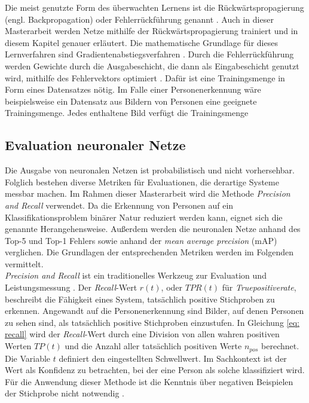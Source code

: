 		Die meist genutzte Form des überwachten Lernens ist die Rückwärtspropagierung (engl. Backpropagation) oder Fehlerrückführung genannt \cite{Ertel}. Auch in dieser Masterarbeit werden Netze mithilfe der Rückwärtspropagierung trainiert und in diesem Kapitel genauer erläutert. Die mathematische Grundlage für dieses Lernverfahren sind Gradientenabstiegsverfahren \cite{Kriesel}. Durch die Fehlerrückführung werden Gewichte durch die Ausgabeschicht, die dann als Eingabeschicht genutzt wird, mithilfe des Fehlervektors optimiert \cite{Kriesel}. Dafür ist eine Trainingsmenge in Form eines Datensatzes nötig. Im Falle einer Personenerkennung wäre beispielsweise ein Datensatz aus Bildern von Personen eine geeignete Trainingsmenge. Jedes enthaltene Bild verfügt die Trainingsmenge\\
		
	
		
		\subsection{Evaluation neuronaler Netze}
		Die Ausgabe von neuronalen Netzen ist probabilistisch und nicht vorhersehbar. Folglich bestehen diverse Metriken für Evaluationen, die derartige Systeme messbar machen. Im Rahmen dieser Masterarbeit wird die Methode \textit{Precision and Recall} verwendet. Da die Erkennung von Personen auf ein Klassifikationsproblem binärer Natur reduziert werden kann, eignet sich die genannte Herangehensweise. Außerdem werden die neuronalen Netze anhand des Top-5 und Top-1 Fehlers sowie anhand der \textit{mean average precision} (mAP) verglichen. Die Grundlagen der entsprechenden Metriken werden im Folgenden vermittelt.\\
		
		\textit{Precision and Recall} ist ein traditionelles Werkzeug zur Evaluation und Leistungsmessung \cite{precisionandrecall}. Der \textit{Recall}-Wert $r(t)$, oder $TPR(t)$ für \textit{Truepositiverate}, beschreibt die Fähigkeit eines System, tatsächlich positive Stichproben zu erkennen. Angewandt auf die Personenerkennung sind Bilder, auf denen Personen zu sehen sind, als tatsächlich positive Stichproben einzustufen. In Gleichung \ref{eq: recall} wird der \textit{Recall}-Wert durch eine Division von allen wahren positiven Werten $TP(t)$ und die Anzahl aller tatsächlich positiven Werte $n_{pos}$ berechnet. Die Variable $t$ definiert den eingestellten Schwellwert. Im Sachkontext ist der Wert als Konfidenz zu betrachten, bei der eine Person als solche klassifiziert wird. Für die Anwendung dieser Methode ist die Kenntnis über negativen Beispielen der Stichprobe nicht notwendig \cite{bildundobjekt}.\\ 
		
